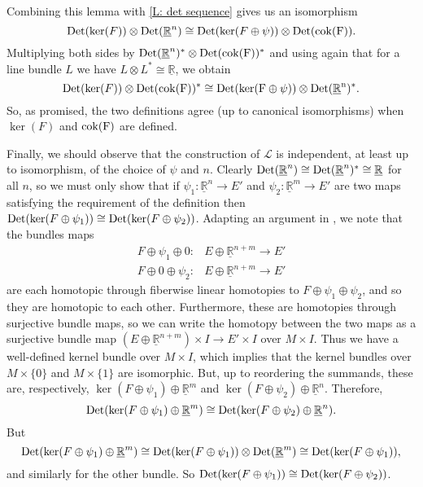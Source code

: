 \documentclass[12pt]{article}
\theoremstyle{plain}
\theoremstyle{definition}
\theoremstyle{remark}
\newcommand{\R}{\mathbb{R}}
\newcommand{\ms}[1]{\mathscr{#1}}
\newcommand{\cok}{\rm{cok}}
\newcommand{\Or}{{\rm Det}}
\begin{document}
Combining this lemma with \cref{L: det sequence} gives us an isomorphism
$$\Or(\ker(F))\otimes \Or(\underline{\R}^n)\cong \Or(\ker(F\oplus \psi))\otimes \Or(\cok(F)).$$
Multiplying both sides by $\Or(\underline{\R}^n)^*\otimes \Or(\cok(F))^*$ and using again that for a line bundle $L$ we have $L\otimes L^*\cong \underline{\R}$, we obtain
$$\Or(\ker(F))\otimes \Or(\cok(F))^*\cong \Or(\ker(F\oplus \psi))\otimes \Or(\underline{\R}^n)^*.$$
So, as promised, the two definitions agree (up to canonical isomorphisms) when $\ker(F)$ and $\cok(F)$ are defined. 


Finally, we should observe that the construction of $\ms L$ is independent, at least up to isomorphism, of the choice of $\psi$ and $n$. Clearly $\Or(\underline{\R}^n)\cong \Or(\underline{\R}^n)^*\cong \underline{\R}$ for all $n$, so we must only show that if $\psi_1:\underline{\R}^n\to E'$ and $\psi_2:\underline{\R}^m\to E'$ are two maps satisfying the requirement of the definition then $\Or(\ker(F\oplus \psi_1))\cong \Or(\ker(F\oplus \psi_2))$. Adapting an argument in \cite[Section 5.1.3]{DoKr90}, we note that the bundles maps
\begin{align*}
F\oplus \psi_1\oplus 0: &E\oplus \underline{\R}^{n+m}\to E'\\
F\oplus 0\oplus \psi_2: &E\oplus \underline{\R}^{n+m}\to E'  
\end{align*} 
are each homotopic through fiberwise linear homotopies to $F\oplus \psi_1\oplus \psi_2$, and so they are homotopic to each other. Furthermore, these are homotopies through surjective bundle maps, so we can write the homotopy between the two maps as a surjective bundle map  $(E\oplus \underline{\R}^{n+m})\times I\to E'\times I$ over $M\times I$. Thus we have a well-defined kernel bundle over $M\times I$, which implies that the kernel bundles over $M\times \{0\}$ and $M\times \{1\}$ are isomorphic. But, up to reordering the summands, these are, respectively, $\ker(F\oplus \psi_1)\oplus \underline{\R}^m$ and $\ker(F\oplus \psi_2)\oplus \underline{\R}^n$. Therefore,
$$\Or(\ker(F\oplus \psi_1)\oplus \underline{\R}^m)\cong \Or(\ker(F\oplus \psi_2)\oplus \underline{\R}^n).$$
But $$\Or(\ker(F\oplus \psi_1)\oplus \underline{\R}^m)\cong \Or(\ker(F\oplus \psi_1))\otimes \Or(\underline{\R}^m)\cong \Or(\ker(F\oplus \psi_1)),$$
and similarly for the other bundle. So $\Or(\ker(F\oplus \psi_1))\cong \Or(\ker(F\oplus \psi_2))$. 






\end{document}
